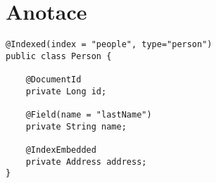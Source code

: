 \documentclass[11pt,oneside]{fithesis2}
\begin{document}


\section{Anotace}
\label{EsAnnotationsAnotace}
\begin{lstlisting}[caption =  Užití anotací Elasticsearch-Annotations, label = AnnotationsExample]
@Indexed(index = "people", type="person")
public class Person {

	@DocumentId
	private Long id;

	@Field(name = "lastName")
	private String name;

	@IndexEmbedded
	private Address address;
}
\end{lstlisting}
\end{document}
